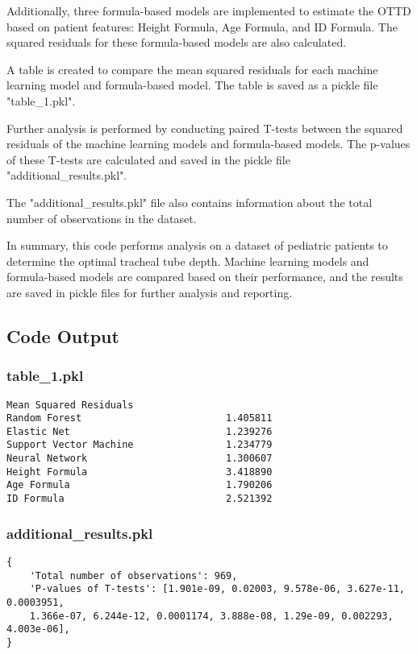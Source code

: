 \documentclass[11pt]{article}
\begin{document}
Additionally, three formula-based models are implemented to estimate the OTTD based on patient features: Height Formula, Age Formula, and ID Formula. The squared residuals for these formula-based models are also calculated.

A table is created to compare the mean squared residuals for each machine learning model and formula-based model. The table is saved as a pickle file "table\_1.pkl".

Further analysis is performed by conducting paired T-tests between the squared residuals of the machine learning models and formula-based models. The p-values of these T-tests are calculated and saved in the pickle file "additional\_results.pkl".

The "additional\_results.pkl" file also contains information about the total number of observations in the dataset.

In summary, this code performs analysis on a dataset of pediatric patients to determine the optimal tracheal tube depth. Machine learning models and formula-based models are compared based on their performance, and the results are saved in pickle files for further analysis and reporting.

\subsection{Code Output}

\subsubsection*{table\_1.pkl}

\begin{Verbatim}[tabsize=4]
                        Mean Squared Residuals
Random Forest                         1.405811
Elastic Net                           1.239276
Support Vector Machine                1.234779
Neural Network                        1.300607
Height Formula                        3.418890
Age Formula                           1.790206
ID Formula                            2.521392
\end{Verbatim}

\subsubsection*{additional\_results.pkl}

\begin{Verbatim}[tabsize=4]
{
    'Total number of observations': 969,
    'P-values of T-tests': [1.901e-09, 0.02003, 9.578e-06, 3.627e-11, 0.0003951,
	1.366e-07, 6.244e-12, 0.0001174, 3.888e-08, 1.29e-09, 0.002293, 4.003e-06],
}
\end{Verbatim}
\end{document}
